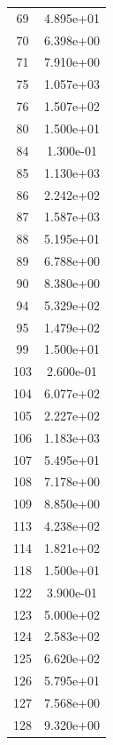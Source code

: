 \documentclass[12pt]{article}
\begin{document}
\begin{longtable}{@{}cc@{}}
69 & 4.895e+01 \\
70 & 6.398e+00 \\
71 & 7.910e+00 \\
75 & 1.057e+03 \\
76 & 1.507e+02 \\
80 & 1.500e+01 \\
84 & 1.300e-01 \\
85 & 1.130e+03 \\
86 & 2.242e+02 \\
87 & 1.587e+03 \\
88 & 5.195e+01 \\
89 & 6.788e+00 \\
90 & 8.380e+00 \\
94 & 5.329e+02 \\
95 & 1.479e+02 \\
99 & 1.500e+01 \\
103 & 2.600e-01 \\
104 & 6.077e+02 \\
105 & 2.227e+02 \\
106 & 1.183e+03 \\
107 & 5.495e+01 \\
108 & 7.178e+00 \\
109 & 8.850e+00 \\
113 & 4.238e+02 \\
114 & 1.821e+02 \\
118 & 1.500e+01 \\
122 & 3.900e-01 \\
123 & 5.000e+02 \\
124 & 2.583e+02 \\
125 & 6.620e+02 \\
126 & 5.795e+01 \\
127 & 7.568e+00 \\
128 & 9.320e+00 \\

\bottomrule
\end{longtable}
\end{document}
